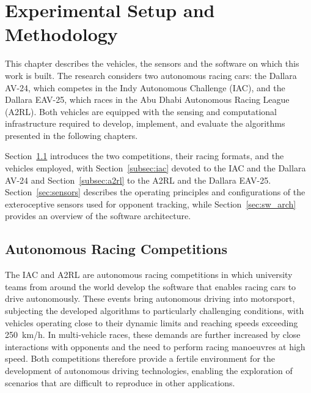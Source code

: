 
\chapter{Experimental Setup and Methodology}
\label{ch:setup}

This chapter describes the vehicles, the sensors and the software on which this work is
built. The research considers two autonomous racing cars: the Dallara AV-24, which competes in
the Indy Autonomous Challenge (IAC), and the Dallara EAV-25, which races in the Abu Dhabi
Autonomous Racing League (A2RL). Both vehicles are equipped with the sensing and computational infrastructure
required to develop, implement, and evaluate the algorithms presented in the following chapters.

Section~\ref{sec:operating_conditions} introduces the two competitions, their racing formats,
and the vehicles employed, with Section~\ref{subsec:iac} devoted to the IAC and the Dallara AV-24
and Section~\ref{subsec:a2rl} to the A2RL and the Dallara EAV-25. Section~\ref{sec:sensors}
describes the operating principles and configurations of the exteroceptive sensors used for
opponent tracking, while Section~\ref{sec:sw_arch} provides an overview of the software
architecture.

\section{Autonomous Racing Competitions}
\label{sec:operating_conditions}

The IAC and A2RL are autonomous racing competitions in which university teams from around the
world develop the software that enables racing cars to drive autonomously. These events bring
autonomous driving into motorsport, subjecting the developed algorithms to particularly
challenging conditions, with vehicles operating close to their dynamic limits and reaching
speeds exceeding \SI{250}{km/h}. In multi-vehicle races, these demands are further increased by
close interactions with opponents and the need to perform racing manoeuvres at high speed. Both
competitions therefore provide a fertile environment for the development of autonomous driving
technologies, enabling the exploration of scenarios that are difficult to reproduce in other
applications.


